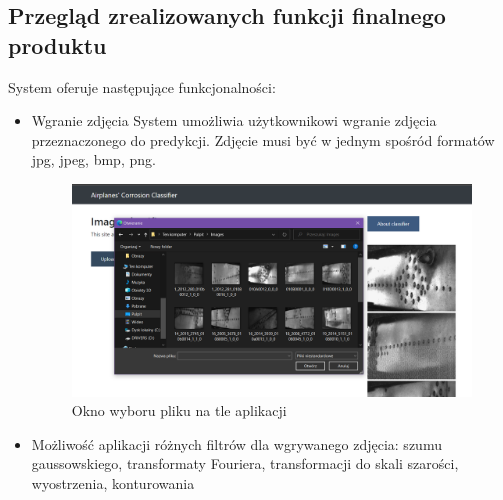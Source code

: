 \documentclass[polish,12pt]{aghthesis}
\begin{document}
\subsection{Przegląd zrealizowanych funkcji finalnego produktu}
\par System oferuje następujące funkcjonalności:
\begin{itemize}
    \item Wgranie zdjęcia
    \newline System umożliwia użytkownikowi wgranie zdjęcia przeznaczonego do predykcji. Zdjęcie musi być w jednym spośród formatów jpg, jpeg, bmp, png.
    \begin{figure}[H]%
    \centering
    \includegraphics[width=12cm]{images/wgranieZdjecia2.PNG}
    \caption{Okno wyboru pliku na tle aplikacji}
    \end{figure}
    \item Możliwość aplikacji różnych filtrów dla wgrywanego zdjęcia: szumu gaussowskiego, transformaty Fouriera, transformacji do skali szarości, wyostrzenia, konturowania
    \begin{figure}[H]
    \begin{adjustbox}{minipage=1.0\paperwidth, pagecenter}
    \centering

\end{adjustbox}
\end{figure}
\end{itemize}
\end{document}
